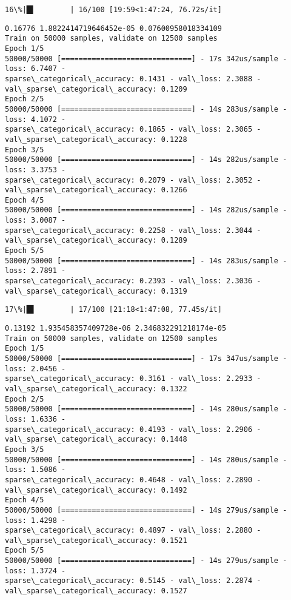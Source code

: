 \documentclass[11pt]{article}
\begin{document}
    \begin{Verbatim}[commandchars=\\\{\}]
 16\%|█▌        | 16/100 [19:59<1:47:24, 76.72s/it]
    \end{Verbatim}

    \begin{Verbatim}[commandchars=\\\{\}]
0.16776 1.8822414719646452e-05 0.07600958018334109
Train on 50000 samples, validate on 12500 samples
Epoch 1/5
50000/50000 [==============================] - 17s 342us/sample - loss: 6.7407 -
sparse\_categorical\_accuracy: 0.1431 - val\_loss: 2.3088 -
val\_sparse\_categorical\_accuracy: 0.1209
Epoch 2/5
50000/50000 [==============================] - 14s 283us/sample - loss: 4.1072 -
sparse\_categorical\_accuracy: 0.1865 - val\_loss: 2.3065 -
val\_sparse\_categorical\_accuracy: 0.1228
Epoch 3/5
50000/50000 [==============================] - 14s 282us/sample - loss: 3.3753 -
sparse\_categorical\_accuracy: 0.2079 - val\_loss: 2.3052 -
val\_sparse\_categorical\_accuracy: 0.1266
Epoch 4/5
50000/50000 [==============================] - 14s 282us/sample - loss: 3.0087 -
sparse\_categorical\_accuracy: 0.2258 - val\_loss: 2.3044 -
val\_sparse\_categorical\_accuracy: 0.1289
Epoch 5/5
50000/50000 [==============================] - 14s 283us/sample - loss: 2.7891 -
sparse\_categorical\_accuracy: 0.2393 - val\_loss: 2.3036 -
val\_sparse\_categorical\_accuracy: 0.1319
    \end{Verbatim}

    \begin{Verbatim}[commandchars=\\\{\}]
 17\%|█▋        | 17/100 [21:18<1:47:08, 77.45s/it]
    \end{Verbatim}

    \begin{Verbatim}[commandchars=\\\{\}]
0.13192 1.935458357409728e-06 2.346832291218174e-05
Train on 50000 samples, validate on 12500 samples
Epoch 1/5
50000/50000 [==============================] - 17s 347us/sample - loss: 2.0456 -
sparse\_categorical\_accuracy: 0.3161 - val\_loss: 2.2933 -
val\_sparse\_categorical\_accuracy: 0.1322
Epoch 2/5
50000/50000 [==============================] - 14s 280us/sample - loss: 1.6336 -
sparse\_categorical\_accuracy: 0.4193 - val\_loss: 2.2906 -
val\_sparse\_categorical\_accuracy: 0.1448
Epoch 3/5
50000/50000 [==============================] - 14s 280us/sample - loss: 1.5086 -
sparse\_categorical\_accuracy: 0.4648 - val\_loss: 2.2890 -
val\_sparse\_categorical\_accuracy: 0.1492
Epoch 4/5
50000/50000 [==============================] - 14s 279us/sample - loss: 1.4298 -
sparse\_categorical\_accuracy: 0.4897 - val\_loss: 2.2880 -
val\_sparse\_categorical\_accuracy: 0.1521
Epoch 5/5
50000/50000 [==============================] - 14s 279us/sample - loss: 1.3724 -
sparse\_categorical\_accuracy: 0.5145 - val\_loss: 2.2874 -
val\_sparse\_categorical\_accuracy: 0.1527
    \end{Verbatim}
\end{document}
